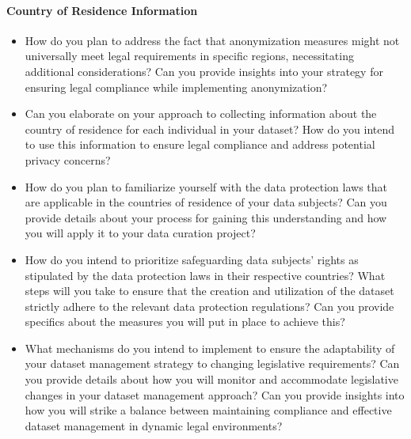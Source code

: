 \paragraph{Country of Residence Information} 
\begin{itemize}
    \item How do you plan to address the fact that anonymization measures might not
    universally meet legal requirements in specific regions, necessitating additional
    considerations? Can you provide insights into your strategy for ensuring legal
    compliance while implementing anonymization?
    \item Can you elaborate on your approach to collecting information about the
    country of residence for each individual in your dataset? How do you intend to use
    this information to ensure legal compliance and address potential privacy concerns?
    \item How do you plan to familiarize yourself with the data protection laws that
    are applicable in the countries of residence of your data subjects? Can you provide
    details about your process for gaining this understanding and how you will apply
    it to your data curation project?
    \item How do you intend to prioritize safeguarding data subjects' rights as
    stipulated by the data protection laws in their respective countries? What steps
    will you take to ensure that the creation and utilization of the dataset strictly
    adhere to the relevant data protection regulations? Can you provide specifics
    about the measures you will put in place to achieve this?
    \item What mechanisms do you intend to implement to ensure the adaptability of
    your dataset management strategy to changing legislative requirements? Can you
    provide details about how you will monitor and accommodate legislative changes
    in your dataset management approach? Can you provide insights into how you will
    strike a balance between maintaining compliance and effective dataset management
    in dynamic legal environments?
\end{itemize}


